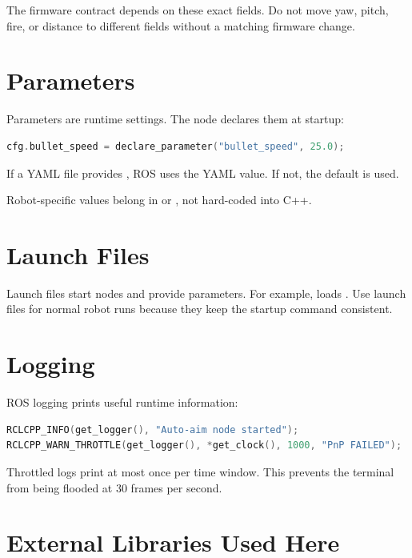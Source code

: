 The firmware contract depends on these exact fields. Do not move yaw, pitch,
fire, or distance to different fields without a matching firmware change.

\section{Parameters}

Parameters are runtime settings. The node declares them at startup:

\begin{lstlisting}[language=C++]
cfg.bullet_speed = declare_parameter("bullet_speed", 25.0);
\end{lstlisting}

If a YAML file provides , ROS uses the YAML value. If not,
the default  is used.

Robot-specific values belong in  or
, not hard-coded into C++.

\section{Launch Files}

Launch files start nodes and provide parameters. For example,
 loads
. Use launch files for normal robot runs
because they keep the startup command consistent.

\section{Logging}

ROS logging prints useful runtime information:

\begin{lstlisting}[language=C++]
RCLCPP_INFO(get_logger(), "Auto-aim node started");
RCLCPP_WARN_THROTTLE(get_logger(), *get_clock(), 1000, "PnP FAILED");
\end{lstlisting}

Throttled logs print at most once per time window. This prevents the terminal
from being flooded at 30 frames per second.

\section{External Libraries Used Here}

